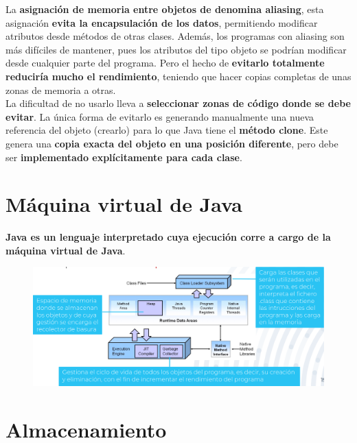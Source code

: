 \documentclass{article}
\begin{document}
La \textbf{asignación de memoria entre objetos de denomina aliasing}, esta asignación \textbf{evita la encapsulación de los datos}, permitiendo modificar atributos desde métodos de otras clases. Además, los programas con aliasing son más difíciles de mantener, pues los atributos del tipo objeto se podrían modificar desde cualquier parte del programa. Pero el hecho de \textbf{evitarlo totalmente reduciría mucho el rendimiento}, teniendo que hacer copias completas de unas zonas de memoria a otras.  \\

La dificultad de no usarlo lleva a \textbf{seleccionar zonas de código donde se debe evitar}. La única forma de evitarlo es generando manualmente una nueva referencia del objeto (crearlo) para lo que Java tiene el \textbf{método clone}. Este genera una \textbf{copia exacta del objeto en una posición diferente}, pero debe ser \textbf{implementado explícitamente para cada clase}.

\section{Máquina virtual de Java}
\textbf{Java es un lenguaje interpretado cuya ejecución corre a cargo de la máquina virtual de Java}.

\begin{figure}[h]
    \centering
    \includegraphics[width=\textwidth]{img-t2/img_318_59.png}
\end{figure}

\newpage

\section{Almacenamiento}
\end{document}
